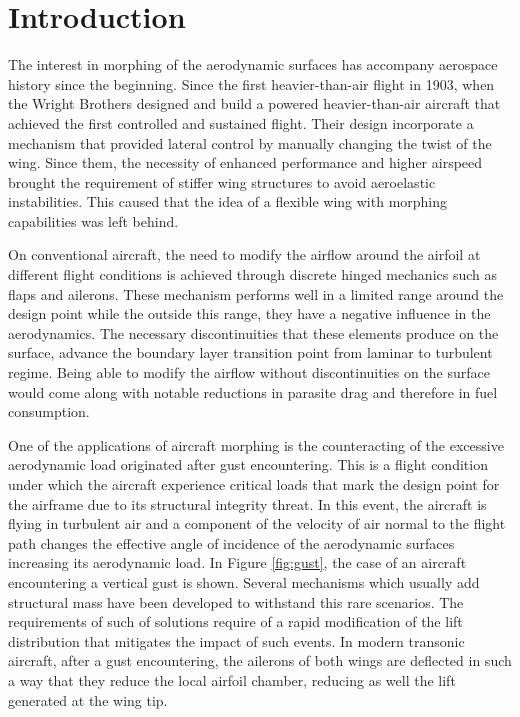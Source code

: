 \chapter{Introduction} \label{chap:introduction}


The interest in morphing of the aerodynamic surfaces has accompany aerospace history since the beginning. Since the first heavier-than-air flight in 1903, when the Wright Brothers designed and build a powered heavier-than-air aircraft that achieved the first controlled and sustained flight. Their design incorporate a mechanism that provided lateral control by manually changing the twist of the wing. Since them, the necessity of enhanced performance and higher airspeed brought the requirement of stiffer wing structures to avoid aeroelastic instabilities. This caused that the idea of a flexible wing with morphing capabilities was left behind.

On conventional aircraft, the need to modify the airflow around the airfoil at different flight conditions is achieved through discrete hinged mechanics such as flaps and ailerons. These mechanism performs well in a limited range around the design point while the outside this range, they have a negative influence in the aerodynamics. The necessary discontinuities that these elements produce on the surface, advance the boundary layer transition point from laminar to turbulent regime. Being able to modify the airflow without discontinuities on the surface would come along with notable reductions in parasite drag and therefore in fuel consumption.

One of the applications of aircraft morphing is the counteracting of the excessive aerodynamic load originated after gust encountering. This is a flight condition under which the aircraft experience critical loads that mark the design point for the airframe due to its structural integrity threat. In this event, the aircraft is flying in turbulent air and a component of the velocity of air normal to the flight path changes the effective angle of incidence of the aerodynamic surfaces increasing its aerodynamic load. In Figure \ref{fig:gust}, the case of an aircraft encountering a vertical gust is shown. Several mechanisms which usually add structural mass have been developed to withstand this rare scenarios. The requirements of such of solutions require of a rapid modification of the lift distribution that mitigates the impact of such events. In modern transonic aircraft, after a gust encountering, the ailerons of both wings are deflected in such a way that they reduce the local airfoil chamber, reducing as well the lift generated at the wing tip.

